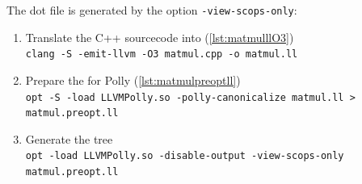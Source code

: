 The dot file is generated by the option \texttt{-view-scops-only}:
\begin{enumerate}
    \item Translate the C++ sourcecode into \llvmir (\autoref{lst:matmulllO3})\\
        \texttt{clang -S -emit-llvm -O3 matmul.cpp -o matmul.ll}
    \item Prepare the \llvmir for Polly (\autoref{lst:matmulpreoptll})\\
        \texttt{opt -S -load LLVMPolly.so -polly-canonicalize matmul.ll > matmul.preopt.ll}
    \item Generate the \scop tree\\
        \texttt{opt -load LLVMPolly.so -disable-output -view-scops-only matmul.preopt.ll}
\end{enumerate}

